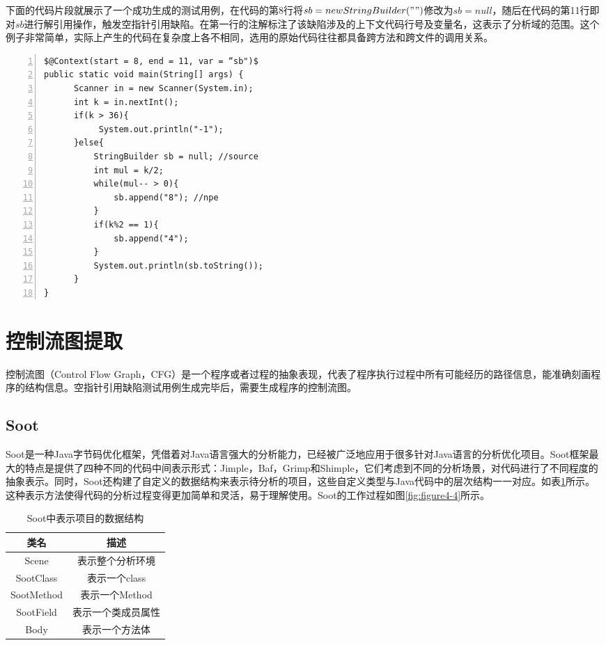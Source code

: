 下面的代码片段就展示了一个成功生成的测试用例，在代码的第8行将$sb = new StringBuilder("")$修改为$sb = null$，随后在代码的第11行即对$sb$进行解引用操作，触发空指针引用缺陷。在第一行的注解标注了该缺陷涉及的上下文代码行号及变量名，这表示了分析域的范围。这个例子非常简单，实际上产生的代码在复杂度上各不相同，选用的原始代码往往都具备跨方法和跨文件的调用关系。 

\begin{lstlisting}[language={[AspectJ]Java},numbers=left,keywordstyle=\color{blue!70},commentstyle=\color{red!50!green!50!blue!50},frame=shadowbox, rulesepcolor=\color{red!20!green!20!blue!20}] 
$@Context(start = 8, end = 11, var = “sb")$
public static void main(String[] args) {
      Scanner in = new Scanner(System.in); 
      int k = in.nextInt();
      if(k > 36){
           System.out.println("-1");
      }else{
          StringBuilder sb = null; //source                 
          int mul = k/2;
          while(mul-- > 0){
              sb.append("8"); //npe
          }
          if(k%2 == 1){
              sb.append("4");
          }
          System.out.println(sb.toString());
      }
}
\end{lstlisting}

\section{控制流图提取}
控制流图（Control Flow Graph，CFG）是一个程序或者过程的抽象表现，代表了程序执行过程中所有可能经历的路径信息，能准确刻画程序的结构信息。空指针引用缺陷测试用例生成完毕后，需要生成程序的控制流图。
\subsection{Soot}
Soot\cite{vallee2010soot}是一种Java字节码优化框架，凭借着对Java语言强大的分析能力，已经被广泛地应用于很多针对Java语言的分析优化项目。Soot框架最大的特点是提供了四种不同的代码中间表示形式：Jimple，Baf，Grimp和Shimple，它们考虑到不同的分析场景，对代码进行了不同程度的抽象表示。同时，Soot还构建了自定义的数据结构来表示待分析的项目，这些自定义类型与Java代码中的层次结构一一对应。如表\ref{tab:table4-2}所示。这种表示方法使得代码的分析过程变得更加简单和灵活，易于理解使用。Soot的工作过程如图\ref{fig:figure4-4}所示。

\begin{table}[hb]
	\centering
	\caption{Soot中表示项目的数据结构} \label{tab:table4-2}
	\begin{tabular*}{0.7\textwidth}{@{\extracolsep{\fill}}cc}
		\toprule
		类名	&描述	 \\
		\midrule
		Scene	&表示整个分析环境\\
		SootClass	&表示一个class	\\
		SootMethod	&表示一个Method	 \\
		SootField	&表示一个类成员属性	\\
		Body	&表示一个方法体 \\
		\bottomrule
	\end{tabular*}
\end{table}


